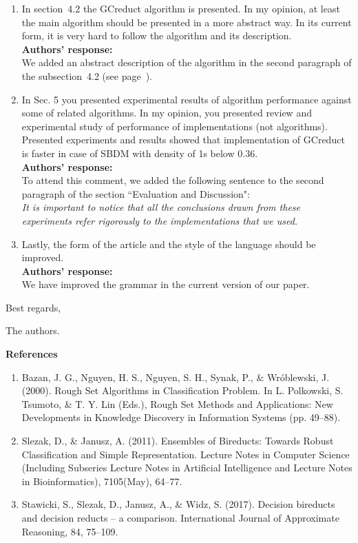 \documentclass{letter}
\begin{document}
\begin{letter}{}
\begin{enumerate}
	\item In section~4.2 the GCreduct algorithm is presented. In my opinion, at least the main algorithm should be presented in a more abstract way. In its current form, it is very hard to follow the algorithm and its description.\\
	\textbf{Authors’ response:}\\
	We added an abstract description of the algorithm in the second paragraph of the subsection~4.2 (see page~\pageref{abstarct}).

	\item In Sec. 5 you presented experimental results of algorithm performance against some of related algorithms. In my opinion, you presented review and experimental  study of performance of implementations (not algorithms). Presented experiments and results showed that implementation of GCreduct is faster in case of SBDM with density of 1s below 0.36.\\
	\textbf{Authors’ response:}\\
	To attend this comment, we added the following sentence to the second paragraph of the section ``Evaluation and Discussion":\\
	\textit{It is important to notice that all the conclusions drawn from these experiments refer rigorously to the implementations that we used.}
	
	\item Lastly, the form of the article and the style of the language should be improved.\\
	\textbf{Authors’ response:}\\
	We have improved the grammar in the current version of our paper.
	
	
  \end{enumerate}     
  
  Best regards,

  The authors.
  
\end{letter}

\textbf{References}
\begin{enumerate}
	\item Bazan, J. G., Nguyen, H. S., Nguyen, S. H., Synak, P., \& Wróblewski, J. (2000). Rough Set Algorithms in Classification Problem. In L. Polkowski, S. Tsumoto, \& T. Y. Lin (Eds.), Rough Set Methods and Applications: New Developments in Knowledge Discovery in Information Systems (pp. 49--88).
	
	\item Slezak, D., \& Janusz, A. (2011). Ensembles of Bireducts: Towards Robust Classification and Simple Representation. Lecture Notes in Computer Science (Including Subseries Lecture Notes in Artificial Intelligence and Lecture Notes in Bioinformatics), 7105(May), 64--77.
	
	\item Stawicki, S., Slezak, D., Janusz, A., \& Widz, S. (2017). Decision bireducts and decision reducts -- a comparison. International Journal of Approximate Reasoning, 84, 75--109.
\end{enumerate}
	
	

	
\end{document}
